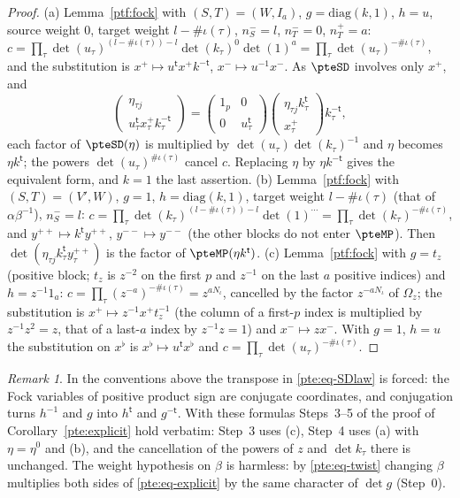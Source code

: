 \documentclass[10pt]{amsart}
\theoremstyle{definition}
\theoremstyle{remark}
\newtheorem{remark}[theorem]{Remark}
\begin{document}
\begin{proof}
(a) Lemma~\ref{ptf:fock} with $(S,T)=(W,I_a)$, $g=\mathrm{diag}(k,1)$, $h=u$, source weight $0$, target
weight $l-\#\iota(\tau)$, $n_S^-=l$, $n_T^-=0$, $n_T^+=a$: $c=\prod_\tau\det(u_\tau)^{(l-\#\iota(\tau))-l}
\det(k_\tau)^{0}\det(1)^{a}=\prod_\tau\det(u_\tau)^{-\#\iota(\tau)}$, and the substitution is $x^+\mapsto u^{\mathsf t}x^+
k^{-\mathsf t}$, $x^-\mapsto u^{-1}x^-$. As $\pteSD$ involves only $x^+$, and
\[
\begin{pmatrix}\eta_{\tau j}\\u^{\mathsf t}_\tau x^+_\tau k_\tau^{-\mathsf t}\end{pmatrix}=\begin{pmatrix}1_p&0\\0&u_\tau^{\mathsf t}
\end{pmatrix}\begin{pmatrix}\eta_{\tau j}k_\tau^{\mathsf t}\\x^+_\tau\end{pmatrix}k_\tau^{-\mathsf t},
\]
each factor of $\pteSD(\eta)$ is multiplied by $\det(u_\tau)\det(k_\tau)^{-1}$ and $\eta$ becomes $\eta k^{\mathsf t}$;
the powers $\det(u_\tau)^{\#\iota(\tau)}$ cancel $c$. Replacing $\eta$ by $\eta k^{-\mathsf t}$ gives the
equivalent form, and $k=1$ the last assertion.
(b) Lemma~\ref{ptf:fock} with $(S,T)=(V',W)$, $g=1$, $h=\mathrm{diag}(k,1)$, target weight
$l-\#\iota(\tau)$ (that of $\alpha\beta^{-1}$), $n_S^-=l$: $c=\prod_\tau\det(k_\tau)^{(l-\#\iota(\tau))-l}\det(1)^{\cdots}=
\prod_\tau\det(k_\tau)^{-\#\iota(\tau)}$, and $y^{++}\mapsto k^{\mathsf t}y^{++}$, $y^{--}\mapsto y^{--}$ (the other blocks do
not enter $\pteMP$). Then $\det(\eta_{\tau j}k^{\mathsf t}_\tau y^{++}_\tau)$ is the factor of $\pteMP(\eta k^{\mathsf t})$.
(c) Lemma~\ref{ptf:fock} with $g=t_z$ (positive block; $t_z$ is $z^{-2}$ on the first $p$ and $z^{-1}$ on the
last $a$ positive indices) and $h=z^{-1}1_a$: $c=\prod_\tau(z^{-a})^{-\#\iota(\tau)}=z^{aN_\iota}$, cancelled by
the factor $z^{-aN_\iota}$ of $\Omega_z$; the substitution is $x^+\mapsto z^{-1}x^+t_z^{-1}$ (the column of a first-$p$
index is multiplied by $z^{-1}z^2=z$, that of a last-$a$ index by $z^{-1}z=1$) and $x^-\mapsto zx^-$. With
$g=1$, $h=u$ the substitution on $x^\flat$ is $x^\flat\mapsto u^{\mathsf t}x^\flat$ and $c=\prod_\tau\det(u_\tau)^{-\#\iota(\tau)}$.
\end{proof}

\begin{remark}\label{ptf:rem-fock}
In the conventions above the transpose in \eqref{pte:eq-SDlaw} is forced: the Fock variables of
positive product sign are conjugate coordinates, and conjugation turns $h^{-1}$ and $g$ into
$h^{\mathsf t}$ and $g^{-\mathsf t}$. With these formulas Steps~3--5 of the proof of
Corollary~\ref{pte:explicit} hold verbatim: Step~3 uses (c), Step~4 uses (a) with $\eta=\eta^0$ and (b),
and the cancellation of the powers of $z$ and $\det k_\tau$ there is unchanged. The weight hypothesis on
$\beta$ is harmless: by \eqref{pte:eq-twist} changing $\beta$ multiplies both sides of
\eqref{pte:eq-explicit} by the same character of $\det g$ (Step~0).
\end{remark}
\end{document}
